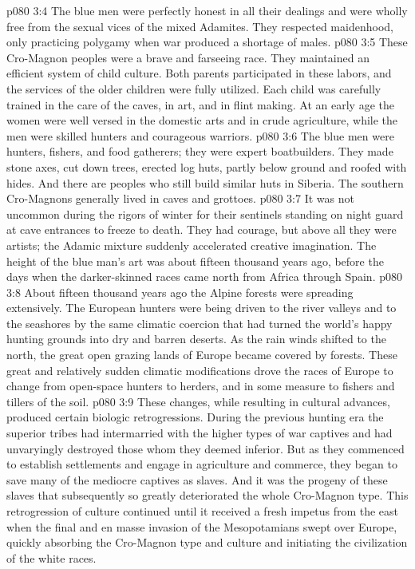 \vs p080 3:4 The blue men were perfectly honest in all their dealings and were wholly free from the sexual vices of the mixed Adamites. They respected maidenhood, only practicing polygamy when war produced a shortage of males.
\vs p080 3:5 These Cro\hyp{}Magnon peoples were a brave and farseeing race. They maintained an efficient system of child culture. Both parents participated in these labors, and the services of the older children were fully utilized. Each child was carefully trained in the care of the caves, in art, and in flint making. At an early age the women were well versed in the domestic arts and in crude agriculture, while the men were skilled hunters and courageous warriors.
\vs p080 3:6 The blue men were hunters, fishers, and food gatherers; they were expert boatbuilders. They made stone axes, cut down trees, erected log huts, partly below ground and roofed with hides. And there are peoples who still build similar huts in Siberia. The southern Cro\hyp{}Magnons generally lived in caves and grottoes.
\vs p080 3:7 It was not uncommon during the rigors of winter for their sentinels standing on night guard at cave entrances to freeze to death. They had courage, but above all they were artists; the Adamic mixture suddenly accelerated creative imagination. The height of the blue man’s art was about fifteen thousand years ago, before the days when the darker\hyp{}skinned races came north from Africa through Spain.
\pc \vs p080 3:8 About fifteen thousand years ago the Alpine forests were spreading extensively. The European hunters were being driven to the river valleys and to the seashores by the same climatic coercion that had turned the world’s happy hunting grounds into dry and barren deserts. As the rain winds shifted to the north, the great open grazing lands of Europe became covered by forests. These great and relatively sudden climatic modifications drove the races of Europe to change from open\hyp{}space hunters to herders, and in some measure to fishers and tillers of the soil.
\vs p080 3:9 These changes, while resulting in cultural advances, produced certain biologic retrogressions. During the previous hunting era the superior tribes had intermarried with the higher types of war captives and had unvaryingly destroyed those whom they deemed inferior. But as they commenced to establish settlements and engage in agriculture and commerce, they began to save many of the mediocre captives as slaves. And it was the progeny of these slaves that subsequently so greatly deteriorated the whole Cro\hyp{}Magnon type. This retrogression of culture continued until it received a fresh impetus from the east when the final and en masse invasion of the Mesopotamians swept over Europe, quickly absorbing the Cro\hyp{}Magnon type and culture and initiating the civilization of the white races.
